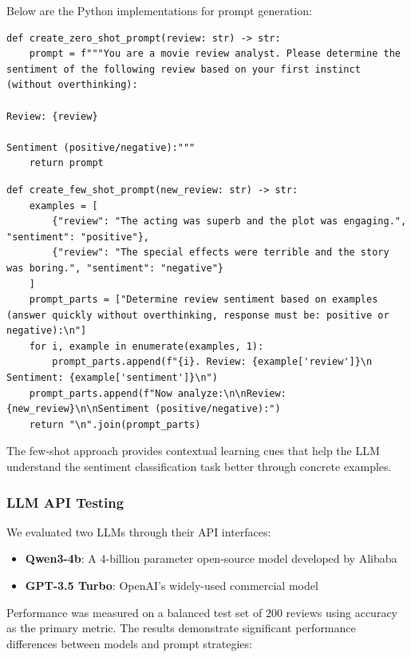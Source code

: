\documentclass{article}
\begin{document}
Below are the Python implementations for prompt generation:

\begin{lstlisting}[caption={Zero-shot prompt design}]
def create_zero_shot_prompt(review: str) -> str:
    prompt = f"""You are a movie review analyst. Please determine the sentiment of the following review based on your first instinct (without overthinking):

Review: {review}

Sentiment (positive/negative):"""
    return prompt
\end{lstlisting}

\begin{lstlisting}[caption={Few-shot prompt design}]
def create_few_shot_prompt(new_review: str) -> str:
    examples = [
        {"review": "The acting was superb and the plot was engaging.", "sentiment": "positive"},
        {"review": "The special effects were terrible and the story was boring.", "sentiment": "negative"}
    ]
    prompt_parts = ["Determine review sentiment based on examples (answer quickly without overthinking, response must be: positive or negative):\n"]
    for i, example in enumerate(examples, 1):
        prompt_parts.append(f"{i}. Review: {example['review']}\n   Sentiment: {example['sentiment']}\n")
    prompt_parts.append(f"Now analyze:\n\nReview: {new_review}\n\nSentiment (positive/negative):")
    return "\n".join(prompt_parts)
\end{lstlisting}

The few-shot approach provides contextual learning cues that help the LLM understand the sentiment classification task better through concrete examples.

\subsubsection{LLM API Testing}
\label{sssec:llm_api}

We evaluated two LLMs through their API interfaces:
\begin{itemize}
    \item \textbf{Qwen3-4b}: A 4-billion parameter open-source model developed by Alibaba
    \item \textbf{GPT-3.5 Turbo}: OpenAI's widely-used commercial model
\end{itemize}

Performance was measured on a balanced test set of 200 reviews using accuracy as the primary metric. The results demonstrate significant performance differences between models and prompt strategies:
\end{document}

